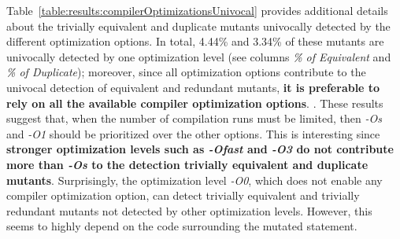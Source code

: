 Table~\ref{table:results:compilerOptimizationsUnivocal} provides additional details about the trivially equivalent and duplicate mutants univocally detected by the different optimization options. In total, 4.44\% and 3.34\% of these mutants are univocally detected  by one optimization level (see columns \emph{\% of Equivalent} and \emph{\% of Duplicate}); moreover, since all optimization options contribute to the univocal detection of equivalent and redundant mutants, \textbf{it is preferable to rely on all the available compiler optimization options}. 
. These results suggest that, when the number of compilation runs must be limited, then \emph{-Os} and \emph{-O1} should be prioritized over the other options. This is interesting since \textbf{stronger optimization levels such as \emph{-Ofast} and \emph{-O3} do not contribute more than \emph{-Os} to the detection trivially equivalent and duplicate mutants}. Surprisingly, the optimization level \emph{-O0}, which does not enable any compiler optimization option, can detect trivially equivalent and trivially redundant mutants not detected by other optimization levels. However, this seems to highly depend on the code surrounding the mutated statement. 



